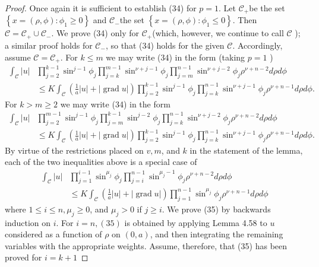 \begin{proof}
  Once again it is sufficient to establish (34) for $p=1$. Let $\mathcal{C}_{+}$be the set $\left\{x=(\rho, \phi): \phi_1 \geq 0\right\}$ and $\mathcal{C}_{-}$the set $\left\{x=(\rho, \phi): \phi_1 \leq 0\right\}$. Then $\mathcal{C}=\mathcal{C}_{+} \cup \mathcal{C}_{-}$. We prove (34) only for $\mathcal{C}_{+}$(which, however, we continue to call $\mathcal{C}$ ); a similar proof holds for $\mathcal{C}_{-}$, so that (34) holds for the given $\mathcal{C}$. Accordingly, assume $\mathcal{C}=\mathcal{C}_{+}$.
  For $k \leq m$ we may write (34) in the form (taking $p=1$ )
  \[
  \begin{aligned}
  \int_{\mathcal{C}}|u| & \prod_{j=2}^{k-1} \sin ^{j-1} \phi_j \prod_{j=k}^{m-1} \sin ^{\nu+j-1} \phi_j \prod_{j=m}^{n-1} \sin ^{\nu+j-2} \phi_j \rho^{\nu+n-2} d \rho d \phi \\
  & \leq K \int_{\mathcal{C}}\left(\frac{1}{a}|u|+|\operatorname{grad} u|\right) \prod_{j=2}^{k-1} \sin ^{j-1} \phi_j \prod_{j=k}^{n-1} \sin ^{\nu+j-1} \phi_j \rho^{\nu+n-1} d \rho d \phi .
  \end{aligned}
  \]
  For $k>m \geq 2$ we may write (34) in the form
  \[
  \begin{aligned}
  \int_{\mathcal{C}}|u| & \prod_{j=2}^{m-1} \sin ^{j-1} \phi_j \prod_{j=m}^{k-1} \sin ^{j-2} \phi_j \prod_{j=k}^{n-1} \sin ^{\nu+j-2} \phi_j \rho^{\nu+n-2} d \rho d \phi \\
  & \leq K \int_{\mathcal{C}}\left(\frac{1}{a}|u|+|\operatorname{grad} u|\right) \prod_{j=2}^{k-1} \sin ^{j-1} \phi_j \prod_{j=k}^{n-1} \sin ^{\nu+j-1} \phi_j \rho^{\nu+n-1} d \rho d \phi .
  \end{aligned}
  \]
  By virtue of the restrictions placed on $v, m$, and $k$ in the statement of the lemma,
  each of the two inequalities above is a special case of
  \[
  \begin{aligned}
  \int_{\mathcal{C}}|u| & \prod_{j=1}^{i-1} \sin ^{\mu_j} \phi_j \prod_{j=i}^{n-1} \sin ^{\mu_j-1} \phi_j \rho^{\nu+n-2} d \rho d \phi \\
  & \leq K \int_{\mathcal{C}}\left(\frac{1}{a}|u|+|\operatorname{grad} u|\right) \prod_{j=1}^{n-1} \sin ^{\mu_j} \phi_j \rho^{\nu+n-1} d \rho d \phi
  \end{aligned}
  \]
  where $1 \leq i \leq n, \mu_j \geq 0$, and $\mu_j>0$ if $j \geq i$.
  We prove (35) by backwards induction on $i$. For $i=n,(35)$ is obtained by applying Lemma 4.58
  to $u$ considered as a function of $\rho$ on $(0, a)$, and then integrating the remaining 
  variables with the appropriate weights. Assume, therefore, that (35) has been proved for $i=k+1$ 

\end{proof}
